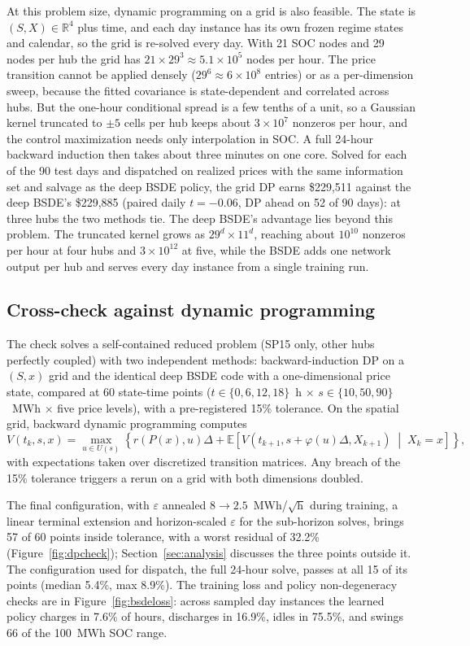 \documentclass[11pt]{article}
\begin{document}
At this problem size, dynamic programming on a grid is also feasible. The
state is $(S, X) \in \mathbb{R}^4$ plus time, and each day instance has
its own frozen regime states and calendar, so the grid is re-solved every
day. With 21 SOC nodes and 29 nodes per hub the grid has
$21 \times 29^3 \approx 5.1\times10^5$ nodes per hour. The price
transition cannot be applied densely ($29^6 \approx 6\times10^8$ entries)
or as a per-dimension sweep, because the fitted covariance is
state-dependent and correlated across hubs. But the one-hour conditional
spread is a few tenths of a unit, so a Gaussian kernel truncated to
$\pm 5$ cells per hub keeps about $3\times10^7$ nonzeros per hour, and the
control maximization needs only interpolation in SOC. A full 24-hour
backward induction then takes about three minutes on one core. Solved for
each of the 90 test days and dispatched on realized prices with the same
information set and salvage as the deep BSDE policy, the grid DP earns
\$229{,}511 against the deep BSDE's \$229{,}885 (paired daily
$t = -0.06$, DP ahead on 52 of 90 days): at three hubs the two methods
tie. The deep BSDE's advantage lies beyond this problem. The truncated
kernel grows as $29^d \times 11^d$, reaching about $10^{10}$ nonzeros per
hour at four hubs and $3\times10^{12}$ at five, while the BSDE adds one
network output per hub and serves every day instance from a single
training run.

\subsection{Cross-check against dynamic programming}
The check solves a self-contained reduced problem
(SP15 only, other hubs perfectly coupled) with two independent
methods: backward-induction DP on a $(S, x)$ grid and the identical deep
BSDE code with a one-dimensional price state, compared at 60 state-time
points ($t \in \{0,6,12,18\}$~h $\times$ $s \in \{10,50,90\}$~MWh
$\times$ five price levels), with a pre-registered 15\% tolerance. On the spatial grid, backward dynamic programming computes
\begin{equation}
V(t_k, s, x) = \max_{u \in U(s)} \left\{ r(P(x), u)\Delta + \mathbb{E}\left[V(t_{k+1}, s + \varphi(u)\Delta, X_{k+1}) \;\middle|\; X_k = x\right] \right\} ,
\label{eq:grid_dp}
\end{equation}
with expectations taken over discretized transition matrices. Any breach
of the 15\% tolerance triggers a rerun on a grid with both dimensions
doubled.

The final
configuration, with $\varepsilon$ annealed $8 \to 2.5$~MWh/$\sqrt{\text{h}}$
during training, a linear terminal extension and horizon-scaled
$\varepsilon$ for the sub-horizon solves, brings 57 of 60 points inside
tolerance, with a worst residual of 32.2\% (Figure~\ref{fig:dpcheck});
Section~\ref{sec:analysis} discusses the three points outside it. The
configuration used for dispatch, the full 24-hour solve, passes at all 15 of its points (median 5.4\%, max
8.9\%). The training loss and policy non-degeneracy checks are in
Figure~\ref{fig:bsdeloss}: across sampled day instances the learned policy
charges in 7.6\% of hours, discharges in 16.9\%, idles in 75.5\%, and
swings 66 of the 100~MWh SOC range.
\end{document}
